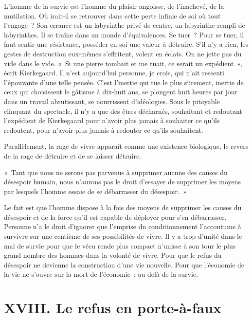 \documentclass[french,twoside]{book} %
\newenvironment{quoteblock}%
  {\begin{quoting}}
  {\end{quoting}}
\newenvironment{quotebar}{%
    \def\FrameCommand{{\color{rubric!10!}\vrule width 0.5em} \hspace{0.9em}}%
    \def\OuterFrameSep{\itemsep} %
    \MakeFramed {\advance\hsize-\width \FrameRestore}
  }%
  {%
    \endMakeFramed
  }
\renewenvironment{quoteblock}%
  {%
    \savenotes
    \setstretch{0.9}
    \normalfont
    \begin{quotebar}
  }
  {%
    \end{quotebar}
    \spewnotes
  }
\begin{document}
\noindent L’homme de la survie est l’homme du plaisir-angoisse, de l’inachevé, de la mutilation. Où irait-il se retrouver dans cette perte infinie de soi où tout l’engage ? Son errance est un labyrinthe privé de centre, un labyrinthe rempli de labyrinthes. Il se traîne dans un monde d’équivalences. Se tuer ? Pour se tuer, il faut sentir une résistance, posséder en soi une valeur à détruire. S’il n’y a rien, les gestes de destruction eux-mêmes s’effritent, volent en éclats. On ne jette pas du vide dans le vide. « Si une pierre tombait et me tuait, ce serait un expédient », écrit Kierkegaard. Il n’est aujourd’hui personne, je crois, qui n’ait ressenti l’épouvante d’une telle pensée. C’est l’inertie qui tue le plus sûrement, inertie de ceux qui choisissent le gâtisme à dix-huit ans, se plongent huit heures par jour dans un travail abrutissant, se nourrissent d’idéologies. Sous le pitoyable clinquant du spectacle, il n’y a que des êtres décharnés, souhaitant et redoutant l’expédient de Kierkegaard pour n’avoir plus jamais à souhaiter ce qu’ils redoutent, pour n’avoir plus jamais à redouter ce qu’ils souhaitent.\par
Parallèlement, la rage de vivre apparaît comme une existence biologique, le revers de la rage de détruire et de se laisser détruire.\par

\begin{quoteblock}
\noindent « Tant que nous ne serons pas parvenus à supprimer aucune des causes du désespoir humain, nous n’aurons pas le droit d’essayer de supprimer les moyens par lesquels l’homme essaie de se débarrasser du désespoir. »\end{quoteblock}

\noindent Le fait est que l’homme dispose à la fois des moyens de supprimer les causes du désespoir et de la force qu’il est capable de déployer pour s’en débarrasser. Personne n’a le droit d’ignorer que l’emprise du conditionnement l’accoutume à survivre sur une centième de ses possibilités de vivre. Il y a trop d’unité dans le mal de survie pour que le vécu rende plus compact n’unisse à son tour le plus grand nombre des hommes dans la volonté de vivre. Pour que le refus du désespoir ne devienne la construction d’une vie nouvelle. Pour que l’économie de la vie ne s’ouvre sur la mort de l’économie ; au-delà de la survie.
\section[{XVIII. Le refus en porte-à-faux}]{XVIII. Le refus en porte-à-faux}\renewcommand{\leftmark}{XVIII. Le refus en porte-à-faux}
\end{document}
